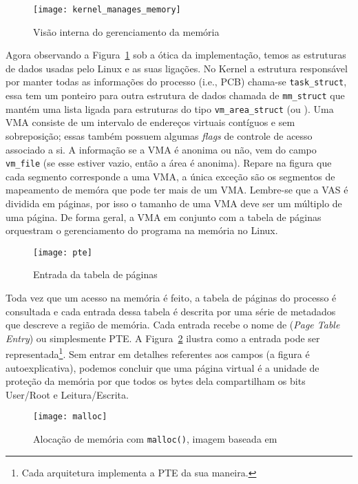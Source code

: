 \begin{figure}[!h]
  \centering
  \texttt{[image: kernel\_manages\_memory]}
  \caption{Visão interna do gerenciamento da memória~\citep{kernel_manage_mem}}
  \label{fig:kernel_manages_memory}
\end{figure}

Agora observando a Figura~\ref{fig:kernel_manages_memory} sob a ótica
da implementação, temos as estruturas de dados usadas pelo Linux e as
suas ligações. No Kernel a estrutura responsável por manter todas as
informações do processo (i.e., PCB) chama-se \texttt{task\_struct}, essa tem um
ponteiro para outra estrutura de dados chamada de \texttt{mm\_struct} que
mantém uma lista ligada para estruturas do tipo \texttt{vm\_area\_struct} (ou
). Uma VMA consiste de um intervalo de
endereços virtuais contíguos e sem sobreposição; essas também possuem algumas
\textit{flags} de controle de acesso associado a si. A informação se a VMA é
anonima ou não, vem do campo \texttt{vm\_file} (se esse estiver vazio, então a
área é anonima). Repare na figura que cada segmento corresponde a uma VMA, a
única exceção são os segmentos de mapeamento de memóra que pode ter mais de um
VMA. Lembre-se que a VAS é dividida em páginas, por isso o tamanho de uma VMA
deve ser um múltiplo de uma página. De forma geral, a VMA em conjunto com a
tabela de páginas orquestram o gerenciamento do programa na memória no Linux.

\begin{figure}[!h]
  \centering
  \texttt{[image: pte]}
  \caption{Entrada da tabela de páginas}
  \label{fig:pte}
\end{figure}

Toda vez que um acesso na memória é feito, a tabela de páginas do processo é
consultada e cada entrada dessa tabela é descrita por uma série de metadados
que descreve a região de memória. Cada entrada recebe o nome de
 (\textit{Page Table Entry}) ou
simplesmente PTE. A Figura~\ref{fig:pte} ilustra como a entrada pode ser
representada\footnote{Cada arquitetura implementa a PTE da sua maneira.}. Sem
entrar em detalhes referentes aos campos (a figura é autoexplicativa), podemos
concluir que uma página virtual é a unidade de proteção da memória por que
todos os bytes dela compartilham os bits User/Root e Leitura/Escrita.

\begin{figure}[!h]
  \centering
  \texttt{[image: malloc]}
  \caption{Alocação de memória com \texttt{malloc()}, imagem baseada em \citep{anatomy_program_mem}}
  \label{fig:malloc_linux}
\end{figure}

